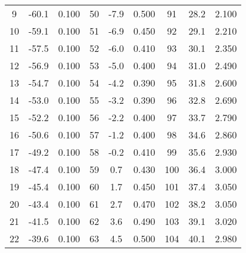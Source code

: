 \begin{table}
\begin{tabular}{c c c@{\hskip 0.5cm}||@{\hskip 0.5cm} c c c@{\hskip 0.5cm} ||@{\hskip 0.5cm} c c c}
9   &    -60.1    &       0.100   & 50  &    -7.9     &       0.500    &  91  &    28.2     &       2.100  \\                                      
10  &    -59.1    &       0.100   & 51  &    -6.9     &       0.450   &  92  &    29.1     &       2.210  \\                                     
11  &    -57.5    &       0.100   & 52  &    -6.0     &       0.410   &  93  &    30.1     &       2.350  \\                                      
12  &    -56.9    &       0.100   & 53  &    -5.0     &       0.400    &  94  &    31.0     &       2.490  \\                                      
13  &    -54.7    &       0.100   & 54  &    -4.2     &       0.390   &  95  &    31.8     &       2.600   \\                                      
14  &    -53.0    &       0.100   & 55  &    -3.2     &       0.390   &  96  &    32.8     &       2.690  \\                                      
15  &    -52.2    &       0.100   & 56  &    -2.2     &       0.400    &  97  &    33.7     &       2.790  \\                                      
16  &    -50.6    &       0.100   & 57  &    -1.2     &       0.400    &  98  &    34.6     &       2.860  \\                                      
17  &    -49.2    &       0.100   & 58  &    -0.2     &       0.410   &  99  &    35.6     &       2.930  \\                                      
18  &    -47.4    &       0.100   & 59  &    0.7      &       0.430   &  100 &    36.4     &       3.000   \\                                      
19  &    -45.4    &       0.100   & 60  &    1.7      &       0.450   &  101 &    37.4     &       3.050  \\                                      
20  &    -43.4    &       0.100   & 61  &    2.7      &       0.470   &  102 &    38.2     &       3.050  \\                                      
21  &    -41.5    &       0.100   & 62  &    3.6      &       0.490   &  103 &    39.1     &       3.020  \\                                      
22  &    -39.6    &       0.100   & 63  &    4.5      &       0.500   &  104 &    40.1     &       2.980  \\                                      

\end{tabular}
\end{table}

